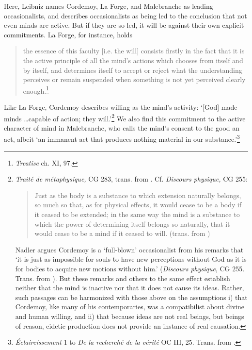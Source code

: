 \documentclass{article}
\begin{document}
Here, Leibniz names Cordemoy, La Forge, and Malebranche as leading
occasionalists, and describes occasionalists as being led to the
conclusion that not even minds are active. But if they are so led, it
will be against their own explicit commitments. La Forge, for instance,
holds

\begin{quote}
the essence of this faculty {[}i.e. the will{]} consists firstly in the
fact that it is the active principle of all the mind's actions which
chooses from itself and by itself, and determines itself to accept or
reject what the understanding perceives or remain suspended when
something is not yet perceived clearly enough.\footnote{\emph{Treatise}
  ch. XI, 97.}
\end{quote}

Like La Forge, Cordemoy describes willing as the mind's activity:
`{[}God{]} made minds \ldots capable of action; they
will.'\footnote{\emph{Traité de métaphysique,} CG 283, trans. from
  \autocite[52]{Nadler2005}. Cf. \emph{Discours physique,} CG 255:

  \begin{quote}
  Just as the body is a substance to which extension naturally belongs,
  so much so that, as for physical effects, it would cease to be a body
  if it ceased to be extended; in the same way the mind is a substance
  to which the power of determining itself belongs so naturally, that it
  would cease to be a mind if it ceased to will. (trans. from \autocite[47]{Nadler2005})
  \end{quote}

  Nadler argues Cordemoy is a `full-blown' occasionalist from his
  remarks that `it is just as impossible for souls to have new
  perceptions without God as it is for bodies to acquire new motions
  without him.' (\emph{Discours physique}, CG 255. Trans. from
  \autocite[50]{Nadler2005}). But these remarks and others to the same effect establish
  neither that the mind is inactive nor that it does not cause its
  ideas. Rather, such passages can be harmonized with those above on the
  assumptions i) that Cordemoy, like many of his contemporaries, was a
  compatibilist about divine and human willing, and ii) that because
  ideas are not real beings, but beings of reason, eidetic production
  does not provide an instance of real causation.} We also find this
commitment to the active character of mind in Malebranche, who calls the
mind's consent to the good an act, albeit `an immanent act that produces
nothing material in our substance.'\footnote{\emph{Éclaircissement} 1 to
  \emph{De la recherché de la vérité} OC III, 25. Trans. from \autocite[52]{Nadler2005}.}
\end{document}

